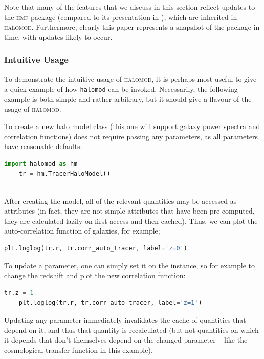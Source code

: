 \documentclass[5p,aas_macros]{elsarticle}
\newcommand{\halomod}{\textsc{halomod}\xspace} %
\providecommand{\DIFdeltex}[1]{{\protect\color{red}\sout{#1}}}                      %
\providecommand{\DIFdelbegin}{} %
\providecommand{\DIFdelend}{} %
\providecommand{\DIFdel}[1]{\texorpdfstring{\DIFdeltex{#1}}{}} %
\begin{document}
Note that many of the features that we discuss in this section reflect updates to the \textsc{hmf} package (compared to its presentation in \citet{Murray2013}\DIFdelbegin \DIFdel{)}\DIFdelend , which are inherited in \textsc{halomod}. Furthermore, clearly this paper represents a snapshot of the package in time, with updates likely to occur. 

\subsubsection{Intuitive Usage}
\label{sec:halomod:overview:usage}
To demonstrate the intuitive usage of \halomod, it is perhaps most useful to give a quick example of how \verb|halomod| can be invoked. 
Necessarily, the following example is both simple and rather arbitrary, but it should give a flavour of the usage of \halomod.

To create a new halo model class (this one will support galaxy power spectra and correlation functions) does not require passing any parameters, as all parameters have reasonable defaults:
	\begin{lstlisting}[language=Python]
	import halomod as hm
	tr = hm.TracerHaloModel()
	
\end{lstlisting}
After creating the model, all of the relevant quantities may be accessed as attributes (in fact, they are not simple attributes that have been pre-computed, they are calculated lazily on first access and then cached).
Thus, we can plot the auto-correlation function of galaxies, for example; 
\begin{lstlisting}[language=Python]
plt.loglog(tr.r, tr.corr_auto_tracer, label='z=0')
\end{lstlisting}
To update a parameter, one can simply set it on the instance, so for example to change the redshift and plot the new correlation function:
%
\begin{lstlisting}[language=Python]
	tr.z = 1
	plt.loglog(tr.r, tr.corr_auto_tracer, label='z=1')
\end{lstlisting}
Updating any parameter immediately invalidates the cache of quantities that depend on it, and thus that quantity is recalculated (but not quantities on which it depends that don't themselves depend on the changed parameter -- like the cosmological transfer function in this example). 
\end{document}
